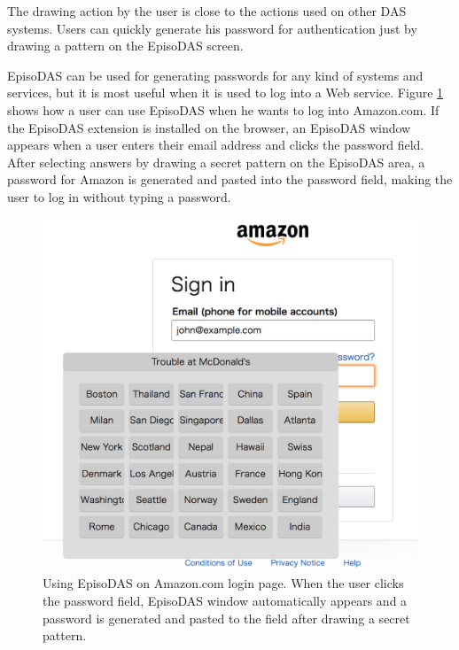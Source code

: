 \documentclass[sigconf]{acmart}
\begin{document}
The drawing action by the user is close to the actions
used on other DAS systems.
Users can quickly generate his password for authentication
just by drawing a pattern on the EpisoDAS screen.

EpisoDAS can be used for generating passwords for any kind of systems and
services, but it is most useful when it is used to log into a Web service.
Figure \ref{Amazon} shows how a user can use EpisoDAS when
he wants to log into Amazon.com.
If the EpisoDAS extension is installed on the browser,
an EpisoDAS window appears when a user enters their
email address and clicks the password field.
After selecting answers by drawing a secret pattern on the EpisoDAS area,
a password for Amazon is generated and pasted
into the password field, making the user to log in without typing a password.


\begin{figure}[t]
  \includegraphics[width=12cm,bb=0 0 1092 1026]{figures/Amazon.png}
  \caption{Using EpisoDAS on Amazon.com login page.
    When the user clicks the password field, EpisoDAS window automatically appears
    and a password is generated and pasted to the field after drawing a
    secret pattern.}
  \label{Amazon}
\end{figure}
\end{document}
